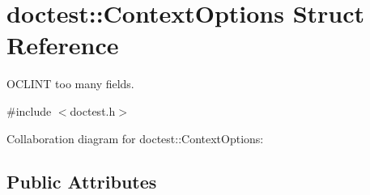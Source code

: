 \hypertarget{structdoctest_1_1_context_options}{}\section{doctest\+:\+:Context\+Options Struct Reference}
\label{structdoctest_1_1_context_options}


O\+C\+L\+I\+NT too many fields.  




{\ttfamily \#include $<$doctest.\+h$>$}



Collaboration diagram for doctest\+:\+:Context\+Options\+:
\subsection*{Public Attributes}
